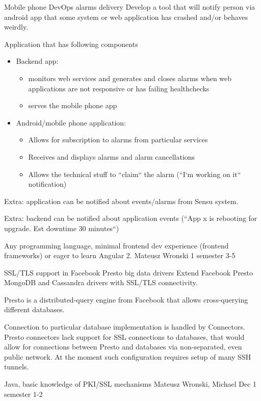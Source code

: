 \begin{project}
{Mobile phone DevOps alarms delivery}
{Develop a tool that will notify person via android app that some system or web application has crashed and/or behaves weirdly.} 
{
Application that has following components
\begin{itemize}
	\item Backend app:
		\begin{itemize}
			\item monitors web services and generates and closes alarms when web applications are not responsive or has failing healthchecks
			\item serves the mobile phone app
		\end{itemize}
	\item Android/mobile phone application:
		\begin{itemize}
			\item Allows for subscription to alarms from particular services
			\item Receives and displays alarms and alarm cancellations
			\item Allows the technical stuff to ``claim`` the alarm (``I`m working on it`` notification)
		\end{itemize}
\end{itemize}
\bigbreak
Extra: application can be notified about events/alarms from Sensu system.

Extra: backend can be notified about application events (``App x is rebooting for upgrade. Est downtime 30 minutes``)
}
{Any programming language, minimal frontend dev experience (frontend frameworks) or eager to learn Angular 2.}
{Mateusz Wronski}
{1 semester}
{3-5}
\end{project}
\begin{project}
{SSL/TLS support in Facebook Presto big data drivers}
{Extend Facebook Presto MongoDB and Cassandra drivers with SSL/TLS connectivity.}
{
Presto is a distributed-query engine from Facebook that allows cross-querying different databases.

Connection to particular database implementation is handled by Connectors. Presto connectors lack support for SSL connections to databases, that would allow for connections between Presto and databases via non-separated, even public network. At the moment such configuration requires setup of many SSH tunnels.
}
{Java, basic knowledge of PKI/SSL mechanisms}
{Mateusz Wronski, Michael Dec}
{1 semester}
{1-2}
\end{project}
